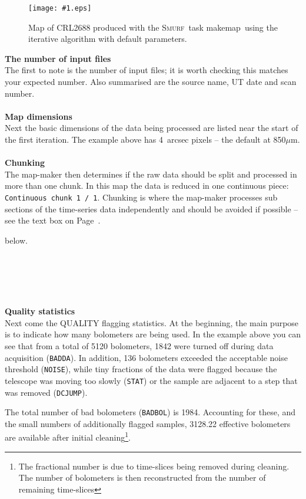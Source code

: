 \documentclass[twoside,11pt]{article}
\newcommand{\htmladdimg}[1]{}
\newenvironment{latexonly}{}{}
\newcommand{\xref}[3]{#1}
\renewcommand{\_}{\texttt{\symbol{95}}}
\newcommand{\smurf}{\xref{\textsc{Smurf}}{sun258}{}}
\newcommand{\task}[1]{\textsf{#1}}
\newcommand{\param}[1]{\texttt{#1}}
\newcommand{\makemap}{\xref{\task{makemap}}{sun258}{MAKEMAP}}
\newcommand{\myfig}[5]{
  \begin{figure}#2
    \centering\texttt{[image: \#1.eps]}
    \typeout{#1.eps inserted on page \arabic{page}}
    \caption{\label{#4}\small #5}
  \end{figure}
}
\newcommand{\myfig}[5]{
    \label{#4} \htmladdimg{#1.png}\\
    \\
    Figure: #5\\
  }
\begin{document}
\myfig{sc21_crl2688}{[t!]}{width=0.7\linewidth}{fig:itermap}{
  Map of CRL2688 produced with the \smurf\ task \makemap\ using
  the iterative algorithm with default parameters.}


\textbf{The number of input files}\\
The first to note is the number of input files; it is worth checking
this matches your expected number. Also summarised are the source
name, UT date and scan number.
\\ \\
\textbf{Map dimensions}\\
Next the basic dimensions of the data being processed are listed near
the start of the first iteration. The example above has 4~arcsec pixels
-- the default at 850$\mu$m.
\\ \\
\textbf{Chunking}\\
The map-maker then determines if the raw data should be split and
processed in more than one chunk. In this map the data is reduced in
one continuous piece: \param{Continuous chunk 1 / 1}. Chunking is
where the map-maker processes sub sections of the time-series data
independently and should be avoided if possible -- see the text box
\begin{latexonly}
on Page~\pageref{page:text}.
\end{latexonly}
\begin{htmlonly}
below.
\end{htmlonly}
\\

\begin{htmlonly}
 \htmladdimg{sc21_data_chunking.png}
 \\ \\
\end{htmlonly}


\textbf{Quality statistics}\\
Next come the QUALITY flagging statistics. At the beginning, the main
purpose is to indicate how many bolometers are being used. In the
example above you can see that from a total of 5120 bolometers, 1842
were turned off during data acquisition (\texttt{BADDA}). In addition,
136 bolometers exceeded the acceptable noise threshold
(\texttt{NOISE}), while tiny fractions of the data were flagged
because the telescope was moving too slowly (\texttt{STAT}) or the
sample are adjacent to a step that was removed (\texttt{DCJUMP}).

The total number of bad bolometers (\texttt{BADBOL}) is 1984.
Accounting for these, and the small numbers of additionally flagged
samples, 3128.22 effective bolometers are available after initial
cleaning\footnote{The fractional number is due to time-slices being
removed during cleaning. The number of bolometers is then
reconstructed from the number of remaining time-slices}.
\end{document}
